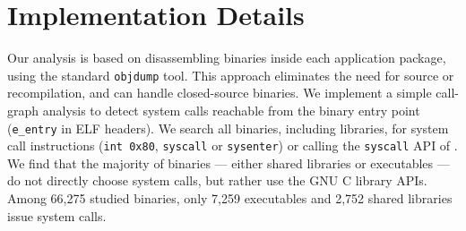 \section{Implementation Details}
\label{sec:syspop:framework}



Our analysis is based on disassembling binaries inside each application package, using the standard {\tt objdump} tool.
This approach eliminates the need for source or recompilation, and can handle closed-source binaries.
We implement a simple call-graph analysis to detect system calls reachable from the binary entry point ({\tt e\_entry} in ELF headers). 
We search all binaries, including libraries, for system call instructions ({\tt int 0x80}, {\tt syscall} or {\tt sysenter}) or calling the {\tt syscall} API of \libc{}.
We find that the majority of binaries --- either shared libraries or executables --- do not directly choose system calls, but 
rather use the GNU C library APIs.
Among 66,275 studied binaries, only 7,259 executables and 2,752 shared libraries issue system calls.





